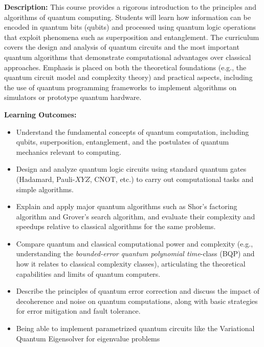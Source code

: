 \documentclass{scrreprt}
\begin{document}
\textbf{Description:} This course provides a rigorous introduction to the principles and algorithms of quantum computing. Students will learn how information can be encoded in quantum bits (qubits) and processed using quantum logic operations that exploit phenomena such as superposition and entanglement. The curriculum covers the design and analysis of quantum circuits and the most important quantum algorithms that demonstrate computational advantages over classical approaches. Emphasis is placed on both the theoretical foundations (e.g., the quantum circuit model and complexity theory) and practical aspects, including the use of quantum programming frameworks to implement algorithms on simulators or prototype quantum hardware.

\textbf{Learning Outcomes:}
\begin{itemize}
\item Understand the fundamental concepts of quantum computation, including qubits, superposition, entanglement, and the postulates of quantum mechanics relevant to computing.
\item Design and analyze quantum logic circuits using standard quantum gates (Hadamard, Pauli-$XYZ$, CNOT, etc.) to carry out computational tasks and simple algorithms. 
\item Explain and apply major quantum algorithms such as Shor’s factoring algorithm and Grover’s search algorithm, and evaluate their complexity and speedups relative to classical algorithms for the same problems.
\item Compare quantum and classical computational power and complexity (e.g., understanding the \textit{bounded-error quantum polynomial time}-class (BQP) and how it relates to classical complexity classes), articulating the theoretical capabilities and limits of quantum computers.
\item Describe the principles of quantum error correction and discuss the impact of decoherence and noise on quantum computations, along with basic strategies for error mitigation and fault tolerance.
\item Being able to implement parametrized quantum circuits like the Variational Quantum Eigensolver for eigenvalue problems
\end{itemize}
\end{document}

